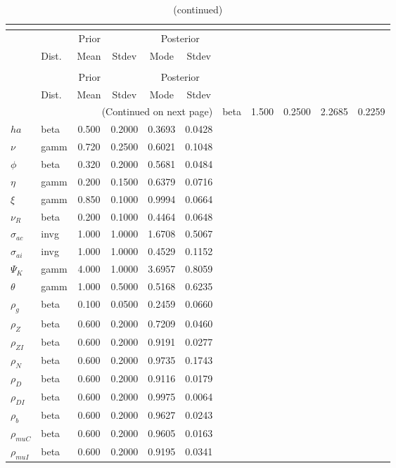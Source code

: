  
\begin{center}
\begin{longtable}{llcccc} 
\caption{Results from posterior maximization (parameters)}\\
 \label{Table:Posterior:1}\\
\toprule 
  & \multicolumn{3}{c}{Prior}  &  \multicolumn{2}{c}{Posterior} \\
  \cmidrule(r{.75em}){2-4} \cmidrule(r{.75em}){5-6}
  & Dist. & Mean  & Stdev & Mode & Stdev \\ 
\midrule \endfirsthead 
\caption{(continued)}\\
 \bottomrule 
  & \multicolumn{3}{c}{Prior}  &  \multicolumn{2}{c}{Posterior} \\
  \cmidrule(r{.75em}){2-4} \cmidrule(r{.75em}){5-6}
  & Dist. & Mean  & Stdev & Mode & Stdev \\ 
\midrule \endhead 
\bottomrule \multicolumn{6}{r}{(Continued on next page)}\endfoot 
\bottomrule\endlastfoot 
${\sigma}$ & beta &   1.500 & 0.2500 &   2.2685 &  0.2259 \\ 
${ha}$ & beta &   0.500 & 0.2000 &   0.3693 &  0.0428 \\ 
$\nu$ & gamm &   0.720 & 0.2500 &   0.6021 &  0.1048 \\ 
${\phi}$ & beta &   0.320 & 0.2000 &   0.5681 &  0.0484 \\ 
${\eta}$ & gamm &   0.200 & 0.1500 &   0.6379 &  0.0716 \\ 
$\xi$ & gamm &   0.850 & 0.1000 &   0.9994 &  0.0664 \\ 
${\nu_R}$ & beta &   0.200 & 0.1000 &   0.4464 &  0.0648 \\ 
${\sigma_{ac}}$ & invg &   1.000 & 1.0000 &   1.6708 &  0.5067 \\ 
${\sigma_{ai}}$ & invg &   1.000 & 1.0000 &   0.4529 &  0.1152 \\ 
${\Psi_{K}}$ & gamm &   4.000 & 1.0000 &   3.6957 &  0.8059 \\ 
${\theta}$ & gamm &   1.000 & 0.5000 &   0.5168 &  0.6235 \\ 
${\rho_g}$ & beta &   0.100 & 0.0500 &   0.2459 &  0.0660 \\ 
${\rho_Z}$ & beta &   0.600 & 0.2000 &   0.7209 &  0.0460 \\ 
${\rho_{ZI}}$ & beta &   0.600 & 0.2000 &   0.9191 &  0.0277 \\ 
${\rho_N}$ & beta &   0.600 & 0.2000 &   0.9735 &  0.1743 \\ 
${\rho_D}$ & beta &   0.600 & 0.2000 &   0.9116 &  0.0179 \\ 
${\rho_{DI}}$ & beta &   0.600 & 0.2000 &   0.9975 &  0.0064 \\ 
${\rho_b}$ & beta &   0.600 & 0.2000 &   0.9627 &  0.0243 \\ 
${\rho_{muC}}$ & beta &   0.600 & 0.2000 &   0.9605 &  0.0163 \\ 
${\rho_{muI}}$ & beta &   0.600 & 0.2000 &   0.9195 &  0.0341 \\ 
\end{longtable}
 \end{center}
